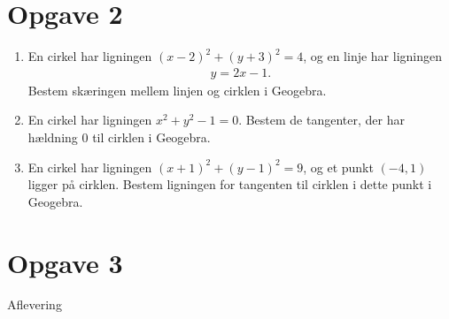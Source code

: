 \documentclass[12pt]{article}
\begin{document}
\section*{Opgave 2}
\begin{enumerate}[label=\roman*)]
\item En cirkel har ligningen $(x-2)^2+(y+3)^2 = 4$, og en linje har ligningen 
\begin{align*}
y=2x-1.
\end{align*}
Bestem skæringen mellem linjen og cirklen i Geogebra. 
\item En cirkel har ligningen $x^2+y^2-1=0$. Bestem de tangenter, der har hældning $0$ til cirklen i Geogebra. 
\item En cirkel har ligningen $(x+1)^2 +(y-1)^2 = 9$, og et punkt $(-4,1)$ ligger på cirklen. Bestem ligningen for tangenten til cirklen i dette punkt i Geogebra. 
\end{enumerate}
\section*{Opgave 3}
Aflevering
\end{document}

